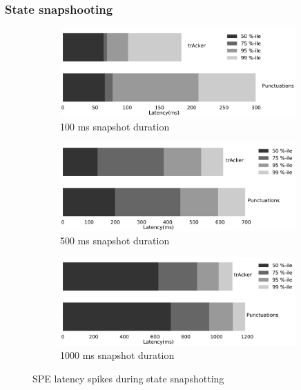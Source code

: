 \subsubsection{State snapshooting}
\begin{figure}[t!]
    \begin{subfigure}[b]{0.32\textwidth}
            \includegraphics[width=0.99\textwidth]{pics/buffering_latencies_barh_100.pdf}
            \caption{100 ms snapshot duration}
            \label{100ms_snapshot}
    \end{subfigure}
    \hspace{5mm}
    \begin{subfigure}[b]{0.32\textwidth}
            \includegraphics[width=0.99\textwidth]{pics/buffering_latencies_barh_500.pdf}
            \caption{500 ms snapshot duration}
            \label{500ms_snapshot}
    \end{subfigure}
    \hspace{5mm}
    \begin{subfigure}[b]{0.32\textwidth}
            \includegraphics[width=0.99\textwidth]{pics/buffering_latencies_barh_1000.pdf}
            \caption{1000 ms snapshot duration}
            \label{1000ms_snapshot}
    \end{subfigure}
    \caption{SPE latency spikes during state snapshotting}
    \label{snapshot_spikes}
\end{figure}


